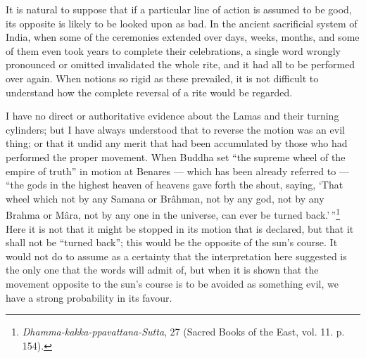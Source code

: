 \documentclass[a4paper, 11pt, oneside, polutonikogreek, english]{article}
\begin{document}
It is natural to suppose that if a particular line of action is assumed to be good, its opposite is likely to be looked upon as bad. In the ancient sacrificial system of India, when some of the ceremonies extended over days, weeks, months, and some of them even took years to complete their celebrations, a single word wrongly pronounced or omitted invalidated the whole rite, and it had all to be performed over again. When notions so rigid as these prevailed, it is not difficult to understand how the complete reversal of a rite would be regarded.

I have no direct or authoritative evidence about the Lamas and their turning cylinders; but I have always understood that to reverse the motion was an evil thing; or that it undid any merit that had been accumulated by those who had performed the proper movement. When Buddha set ``the supreme wheel of the empire of truth'' in motion at Benares --- which has been already referred to --- ``the gods in the highest heaven of heavens gave forth the shout, saying, `That wheel which not by any Samana or Brâhman, not by any god, not by any Brahma or Mâra, not by any one in the universe, can ever be turned back.'\,''\footnote{\emph{Dhamma-kakka-ppavattana-Sutta}, 27 (Sacred Books of the East, vol. 11. p. 154).} Here it is not that it might be stopped in its motion that is declared, but that it shall not be ``turned back''; this would be the opposite of the sun's course. It would not do to assume as a certainty that the interpretation here suggested is the only one that the words will admit of, but when it is shown that the movement opposite to the sun's course is to be avoided as something evil, we have a strong probability in its favour.
\end{document}
